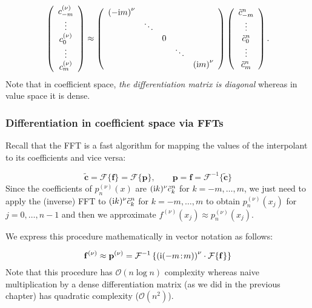 \documentclass[12pt,landscape]{article}
\begin{document}
{\[
\left(
\begin{array}{c}
c_{-m}^{(\nu)} \\
\vdots \\
c_{0}^{(\nu)} \\
\vdots \\
c_{m}^{(\nu)}
\end{array}
\right) \approx
\left(
\begin{array}{c c c c c}
\left(-{\rm i}m\right)^{\nu} &  &  &  &   \\
   & \ddots &   & &   \\
      &  &  0 & &   \\
         &  &   & \ddots &   \\
   &   & &     & \left({\rm i}m\right)^{\nu}
\end{array}
\right)
\left(
\begin{array}{c}
\tilde{c}^n_{-m} \\
\vdots \\
\tilde{c}^n_{0} \\
\vdots \\
\tilde{c}^n_{m}
\end{array}
\right).
\]
Note that in coefficient space, \emph{the differentiation matrix is diagonal} whereas in value space it is dense.

\subsubsection{Differentiation in coefficient space via FFTs}
Recall that the FFT is a fast algorithm for mapping the values of the interpolant to its coefficients and vice versa:

\[
\tilde{\mathbf{c}} = \mathcal{F}\lbrace \mathbf{f}  \rbrace = \mathcal{F}\lbrace \mathbf{p}  \rbrace, \qquad  \mathbf{p} =  \mathbf{f} = \mathcal{F}^{-1}\lbrace\tilde{\mathbf{c}}\rbrace 
\]
Since the coefficients of $p^{(\nu)}_n(x)$ are $({\rm i} k)^{\nu}\tilde{c}^n_k$ for $k = -m, \ldots, m$, we just need to apply the (inverse) FFT to $({\rm i} k)^{\nu}\tilde{c}^n_k$ for $k = -m, \ldots, m$ to obtain $p^{(\nu)}_n(x_j)$ for $j = 0, \ldots, n-1$ and then we approximate $f^{(\nu)}(x_j) \approx p^{(\nu)}_n(x_j)$.

We express this procedure mathematically in vector notation as follows:

\[
\mathbf{f}^{(\nu)} \approx \mathbf{p}^{(\nu)} = 
\mathcal{F}^{-1}\left\lbrace\left({\rm i}(-m\!:\!m)\right)^{\nu}\cdot\mathcal{F}\lbrace \mathbf{f} \rbrace\right\rbrace
\]
Note that this procedure has $\mathcal{O}(n \log n)$ complexity whereas naive multiplication by a dense differentiation matrix (as we did in the previous chapter) has quadratic complexity ($\mathcal{O}(n^2)$).

}
\end{document}
